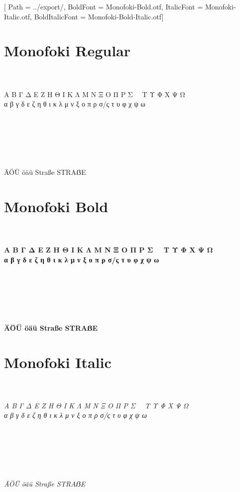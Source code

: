 \documentclass[12pt, a4paper]{article}
\begin{document}
\setmainfont{Monofoki-Regular.otf}[
Path = ../export/,
BoldFont = Monofoki-Bold.otf,
ItalicFont = Monofoki-Italic.otf,
BoldItalicFont  = Monofoki-Bold-Italic.otf]

\section*{Monofoki Regular}

\noindent\AZtext\\
\noindent\aztext\\
\noindent Α Β Γ Δ Ε Ζ Η Θ Ι Κ Λ Μ Ν Ξ Ο Π Ρ Σ~~ Τ Υ Φ Χ Ψ Ω\\
\noindent α β γ δ ε ζ η θ ι κ λ μ ν ξ ο π ρ σ/ς τ υ φ χ ψ ω\\
\noindent\digitstext\\
\noindent\punctext\\
~\\
~\\
\lipsum[0-1]
~\\
~\\
\noindent ÄÖÜ öäü Straße STRAẞE\\

\newpage

\section*{Monofoki Bold}

\noindent\textbf{%
\noindent\AZtext\\
\noindent\aztext\\
\noindent Α Β Γ Δ Ε Ζ Η Θ Ι Κ Λ Μ Ν Ξ Ο Π Ρ Σ~~ Τ Υ Φ Χ Ψ Ω\\
\noindent α β γ δ ε ζ η θ ι κ λ μ ν ξ ο π ρ σ/ς τ υ φ χ ψ ω\\
\noindent\digitstext\\
\noindent\punctext\\
~\\
~\\
\lipsum[0-1]
~\\
~\\
\noindent ÄÖÜ öäü Straße STRAẞE\\
}

\newpage

\section*{Monofoki Italic}

\noindent\textit{%
\noindent\AZtext\\
\noindent\aztext\\
\noindent Α Β Γ Δ Ε Ζ Η Θ Ι Κ Λ Μ Ν Ξ Ο Π Ρ Σ~~ Τ Υ Φ Χ Ψ Ω\\
\noindent α β γ δ ε ζ η θ ι κ λ μ ν ξ ο π ρ σ/ς τ υ φ χ ψ ω\\
\noindent\digitstext\\
\noindent\punctext\\
~\\
~\\
\lipsum[0-1]
~\\
~\\
\noindent ÄÖÜ öäü Straße STRAẞE\\
}
\end{document}
